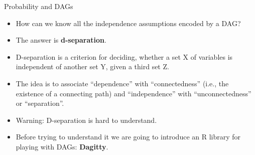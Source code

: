 \documentclass[handout]{beamer}
\begin{document}
\begin{frame}{Probability and DAGs}
\scriptsize{
\begin{itemize}



\item How can we know all the independence assumptions encoded by a DAG?

\item The answer is \textbf{d-separation}.


\item D-separation is a criterion for deciding,  whether a set X of variables is independent of another set Y, given a third set Z. 

\item The idea is to associate ``dependence'' with ``connectedness'' (i.e., the existence of a connecting path) and ``independence'' with ``unconnectedness'' or ``separation''.

\item Warning: D-separation is hard to understand.

\item Before trying to understand it we are going to introduce an R library for playing with DAGs: \textbf{Dagitty}.

\end{itemize}



} 

\end{frame}
\end{document}
